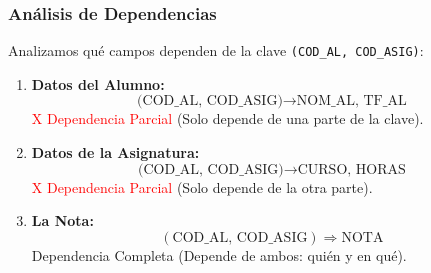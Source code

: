 \documentclass{beamer}
\begin{document}
\begin{frame}
  \frametitle{Análisis de Dependencias}

  Analizamos qué campos dependen de la clave \texttt{(COD\_AL, COD\_ASIG)}:

  \begin{enumerate}
      \item \textbf{Datos del Alumno:}
      $$ \text{(COD\_AL, COD\_ASIG)} \to \text{NOM\_AL, TF\_AL} $$
      \textcolor{red}{X Dependencia Parcial} (Solo depende de una parte de la clave).

      \item \textbf{Datos de la Asignatura:}
      $$ \text{(COD\_AL, COD\_ASIG)} \to \text{CURSO, HORAS} $$
      \textcolor{red}{X Dependencia Parcial} (Solo depende de la otra parte).

      \item \textbf{La Nota:}
      $$ (\text{COD\_AL, COD\_ASIG}) \Rightarrow \text{NOTA} $$
      \textcolor{mygreen}{\checkmark Dependencia Completa} (Depende de ambos: quién y en qué).
  \end{enumerate}
\end{frame}
\end{document}
